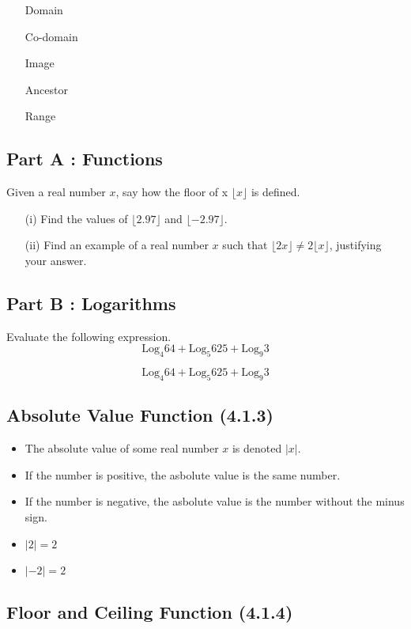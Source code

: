 \documentclass[]{report}
\begin{document}
\begin{itemize}
	\item[Domain]
	\item[Co-domain]
	\item[Image]
	\item[Ancestor]
	\item[Range]
\end{itemize}

\subsection*{Part A : Functions}
Given a real number $x$, say how the floor of x  $\lfloor x \rfloor$ is defined.
\begin{itemize}
	\item[(i)] Find the values of $\lfloor 2.97 \rfloor$ and $\lfloor -2.97 \rfloor$.
	\item[(ii)] Find an example of a real number $x$ such that $\lfloor 2x \rfloor  \neq 2\lfloor x \rfloor$, justifying your answer.
\end{itemize}



\subsection*{Part B : Logarithms}
Evaluate the following expression.
\[ \mbox{Log}_4 64 + \mbox{Log}_5 625 + \mbox{Log}_9 3 \] 

\[ \mbox{Log}_4 64 + \mbox{Log}_5 625 + \mbox{Log}_9 3 \] 

\newpage


\subsection*{Absolute Value Function (4.1.3)}


\begin{itemize}
	\item The absolute value of some real number $x$ is denoted $|x|$.
	\item If the number is positive, the asbolute value is the same number.
	\item If the number is negative, the asbolute value is the number without the minus sign.
	\item $|2|=2$
	\item $|-2| = 2$
\end{itemize}
\subsection*{Floor and Ceiling Function (4.1.4)}
\end{document}

